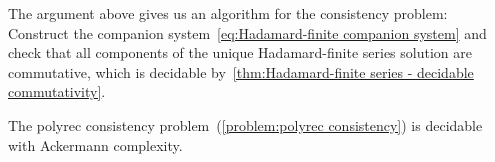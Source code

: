The argument above gives us an algorithm for the consistency problem:
%
Construct the companion system~\cref{eq:Hadamard-finite companion system}
and check that all components of the unique Hadamard-finite series solution are commutative,
which is decidable by~\cref{thm:Hadamard-finite series - decidable commutativity}.
%
\begin{theorem}
    \label{thm:polyrec consistency}
    The polyrec consistency problem~(\cref{problem:polyrec consistency}) is decidable
    with Ackermann complexity.
\end{theorem}
